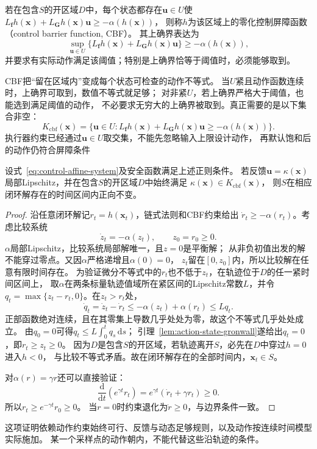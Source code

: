 \begin{definition}[零化控制屏障函数]
\label{def:control-cbf}
若在包含$S$的开区域$D$中，每个状态都存在$\bm u\in U$使
$L_{\bm f}h(\bm x)+L_{\bm G}h(\bm x)\bm u\geq-\alpha(h(\bm x))$，
则称$h$为该区域上的零化控制屏障函数（control barrier function, CBF）。
其上确界表达为
\begin{equation}
  \sup_{\bm u\in U}
  \{L_{\bm f}h(\bm x)+L_{\bm G}h(\bm x)\bm u\}
  \geq-\alpha(h(\bm x)),
  \label{eq:control-cbf-existence}
\end{equation}
并要求有实际动作满足该阈值；特别是上确界恰等于阈值时，必须能够取到。
\end{definition}
CBF把“留在区域内”变成每个状态可检查的动作不等式。
当$U$紧且动作函数连续时，上确界可取到，数值不等式就足够；
对非紧$U$，若上确界严格大于阈值，也能选到满足阈值的动作，
不必要求无穷大的上确界被取到。真正需要的是以下集合非空：
\begin{equation}
  K_{\mathrm{cbf}}(\bm x)=
  \{\bm u\in U:L_{\bm f}h(\bm x)+L_{\bm G}h(\bm x)\bm u
                      \geq-\alpha(h(\bm x))\}.
  \label{eq:control-cbf-action-set}
\end{equation}
执行器约束已经通过$\bm u\in U$取交集，不能先忽略输入上限设计动作，
再默认饱和后的动作仍符合屏障条件

\begin{theorem}[CBF条件保证正向不变]
\label{thm:control-cbf-invariance}
设式~\eqref{eq:control-affine-system}及安全函数满足上述正则条件。
若反馈$\bm u=\kappa(\bm x)$局部Lipschitz，并在包含$S$的开区域$D$中始终满足
$\kappa(\bm x)\in K_{\mathrm{cbf}}(\bm x)$，
则$S$在相应闭环解存在的时间区间内正向不变。
\end{theorem}
\begin{proof}
沿任意闭环解记$r_t=h(\bm x_t)$，链式法则和CBF约束给出
$\dot r_t\geq-\alpha(r_t)$。考虑比较系统
\[
  \dot z_t=-\alpha(z_t),\qquad z_0=r_0\geq0.
\]
$\alpha$局部Lipschitz，比较系统局部解唯一，且$z=0$是平衡解；
从非负初值出发的解不能穿过零点。又因$\alpha$严格递增且$\alpha(0)=0$，
$z_t$留在$[0,z_0]$内，所以比较解在任意有限时间存在。
为验证微分不等式中的$r_t$也不低于$z_t$，在轨迹位于$D$的任一紧时间区间上，
取$\alpha$在两条标量轨迹值域所在紧区间的Lipschitz常数$L$，并令
$q_t=\max\{z_t-r_t,0\}$。在$z_t>r_t$处，
\[
 \dot q_t=\dot z_t-\dot r_t
 \leq-\alpha(z_t)+\alpha(r_t)\leq Lq_t.
\]
正部函数绝对连续，且在其零集上导数几乎处处为零，故这个不等式几乎处处成立。
由$q_0=0$可得$q_t\leq L\int_0^tq_s\,\mathrm ds$；
引理~\ref{lem:action-state-gronwall}遂给出$q_t=0$，即$r_t\geq z_t\geq0$。
因为$D$是包含$S$的开区域，若轨迹离开$S$，必先在$D$中穿过$h=0$进入$h<0$，
与比较不等式矛盾。故在闭环解存在的全部时间内，$\bm x_t\in S$。

对$\alpha(r)=\gamma r$还可以直接验证：
\[
  \frac{\mathrm d}{\mathrm dt}(e^{\gamma t}r_t)
  =e^{\gamma t}(\dot r_t+\gamma r_t)\geq0.
\]
所以$r_t\geq e^{-\gamma t}r_0\geq0$。
当$r=0$时约束退化为$\dot r\geq0$，与边界条件一致。
\end{proof}
这项证明依赖动作约束始终可行、反馈与动态足够规则，以及动作按连续时间模型实际施加。
某一个采样点的动作朝内，不能代替这些沿轨迹的条件。

